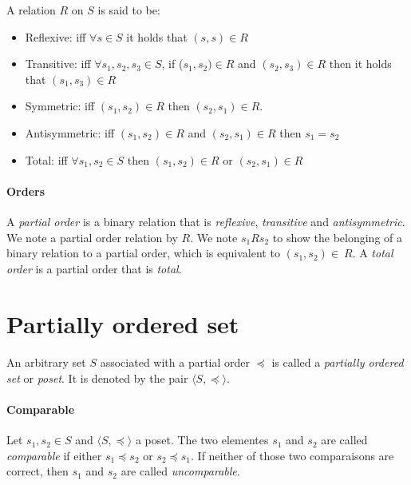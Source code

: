 \documentclass[letterpaper]{memoir}
\begin{document}
A relation $R$ on $S$ is said to be:

\begin{itemize}
    \item Reflexive:
    iff $\forall s \in S$ it holds that $(s, s) \in R$
    \item Transitive:
    iff $\forall s_1, s_2, s_3 \in S$,
    if ($s_1, s_2) \in R$ and $(s_2, s_3) \in R$
    then it holds that $(s_1, s_3) \in R$
    \item Symmetric: iff $(s_1, s_2) \in R$ then $(s_2, s_1) \in R$.
    \item Antisymmetric: iff $(s_1, s_2) \in R$
    and $(s_2, s_1) \in R$ then $s_1 = s_2$
    \item Total: iff $\forall s_1, s_2 \in S$ then $(s_1, s_2) \in R$
    or $(s_2, s_1) \in R$
    
\end{itemize}

\paragraph{Orders}

A \textit{partial order} is a binary relation that is \textit{reflexive},
\textit{transitive} and \textit{antisymmetric}. We note a
partial order relation by $R$.
We note $s_1 R  s_2$ to show the belonging of
a binary relation to a partial order, which is equivalent
to $(s_1, s_2) \in \ R$.
A \textit{total order} is a partial order that is \textit{total}.

\section{Partially ordered set}

\paragraph{}

An arbitrary set $S$ associated with a partial order $\preceq$
is called a \textit{partially ordered set} or \textit{poset}.
It is denoted by the pair $\langle S, \preceq \rangle$.

\paragraph{Comparable}

Let $s_1, s_2 \in S$ and $\langle S, \preceq \rangle$ a poset.
The two elementes $s_1$ and $s_2$ are called \textit{comparable} if either
$s_1 \preceq s_2$ or $s_2 \preceq s_1$. If neither of those two comparaisons
are correct, then $s_1$ and $s_2$ are called \textit{uncomparable}.
\end{document}
